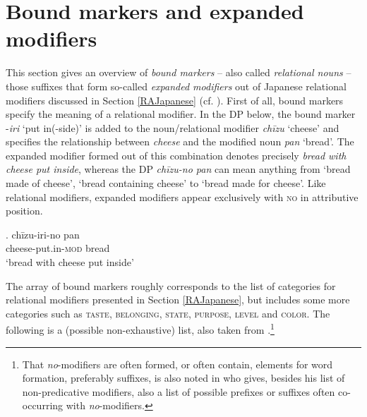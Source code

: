 \appendix


\chapter{Bound markers and expanded modifiers}

This section gives an overview of \textit{bound markers} -- also called \textit{relational nouns} -- those suffixes that form so-called \textit{expanded modifiers} out of Japanese relational modifiers discussed in Section \ref{RAJapanese} (cf. \citealt{nagano:2016:are, shimada:2018:relational}). First of all, bound markers specify the meaning of a relational modifier. In the DP below, the bound marker -\textit{iri} `put in(-side)’ is added to the noun/relational modifier \textit{chīzu} `cheese’ and specifies the relationship between \textit{cheese} and the modified noun \textit{pan} `bread’. The expanded modifier formed out of this combination denotes precisely \textit{bread with cheese put inside}, whereas the DP \textit{chīzu-no pan} can mean anything from `bread made of cheese', `bread containing cheese' to `bread made for cheese’. Like relational modifiers, expanded modifiers appear exclusively with \textsc{no} in attributive position.

\setcounter{ExNo}{0}

\exg. chīzu-iri-no pan\\
cheese-put.in-\textsc{mod} bread\\
`bread with cheese put inside' \label{chizuiri}

The array of bound markers roughly corresponds to the list of categories for relational modifiers presented in Section \ref{RAJapanese}, but includes some more categories such as \textsc{taste}, \textsc{belonging}, \textsc{state}, \textsc{purpose}, \textsc{level} and \textsc{color}. The following is a (possible non-exhaustive) list, also taken from \citet[56–57]{nagano:2016:are}.\footnote{That \textit{no}-modifiers are often formed, or often contain, elements for word formation, preferably suffixes, is also noted in \citet[195–205]{muraki:2012:nihongo} who gives, besides his list of non-predicative modifiers, also a list of possible prefixes or suffixes often co-occurring with \textit{no}-modifiers.}

